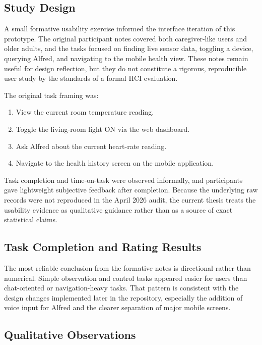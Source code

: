 \subsection{Study Design}

A small formative usability exercise informed the interface iteration of this
prototype. The original participant notes covered both caregiver-like users and
older adults, and the tasks focused on finding live sensor data, toggling a
device, querying Alfred, and navigating to the mobile health view. These notes
remain useful for design reflection, but they do not constitute a rigorous,
reproducible user study by the standards of a formal HCI evaluation.

The original task framing was:

\begin{enumerate}
    \item View the current room temperature reading.
    \item Toggle the living-room light ON via the web dashboard.
    \item Ask Alfred about the current heart-rate reading.
    \item Navigate to the health history screen on the mobile application.
\end{enumerate}

Task completion and time-on-task were observed informally, and participants gave
lightweight subjective feedback after completion. Because the underlying raw
records were not reproduced in the April 2026 audit, the current thesis treats
the usability evidence as qualitative guidance rather than as a source of exact
statistical claims.

\subsection{Task Completion and Rating Results}

The most reliable conclusion from the formative notes is directional rather than
numerical. Simple observation and control tasks appeared easier for users than
chat-oriented or navigation-heavy tasks. That pattern is consistent with the
design changes implemented later in the repository, especially the addition of
voice input for Alfred and the clearer separation of major mobile screens.

\subsection{Qualitative Observations}


